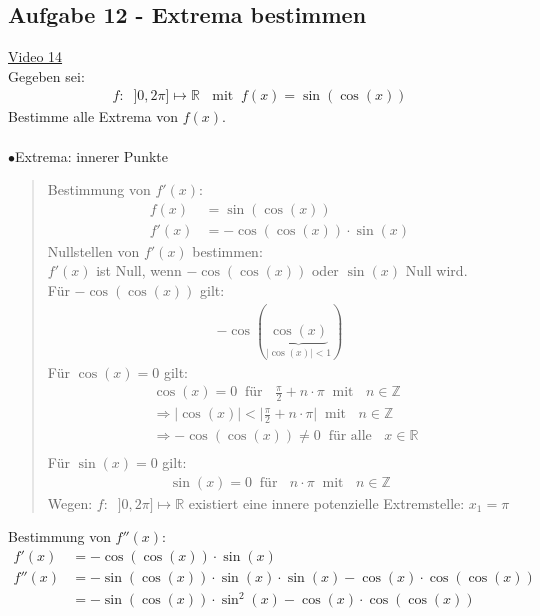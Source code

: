\subsection{Aufgabe 12 - Extrema bestimmen}
\href{https://youtu.be/cN-hCDhSnWw}{Video 14}\\
Gegeben sei:\\
\begin{align*}
f:\;\;]0,2\pi]\longmapsto\mathbb{R}\;\;\text{ mit}\;\;f(x)=\sin(\cos(x))
\end{align*}
Bestimme alle Extrema von $ f(x) $.\\
\\
$ \bullet $\;\;Extrema: \glqq innerer Punkte \grqq\\
\begin{quote}
	
	Bestimmung von $ f'(x) $:\\
	\begin{align*}
	f(x)&=\sin(\cos(x))\\
	f'(x)&=-\cos(\cos(x))\cdot \sin(x)
	\end{align*}
	Nullstellen von $ f'(x) $ bestimmen:\\
	$ f'(x) $ ist Null, wenn $ -\cos(\cos(x)) $ oder $ \sin(x) $ Null wird.\\
	Für $ -\cos(\cos(x)) $ gilt:
	\begin{align*}
	-\cos(\underbrace {\cos(x)}_{|\cos(x)|<1})
	\end{align*}
	Für $ \cos(x)=0 $ gilt:\\
	\begin{align*}
	&	\cos(x)=0\;\; \text{für }\;\;\frac{\pi}{2}+ n\cdot \pi\;\;\text{mit }\;\;n\in \mathbb{Z}\\
	&	\Rightarrow |\cos(x)|<\big|\frac{\pi}{2}+ n\cdot \pi\big|\;\;\text{mit }\;\;n\in \mathbb{Z}\\
	&\Rightarrow-\cos(\cos(x))\neq 0\;\;\text{für alle }\;\;x\in\mathbb{R}\\
	\end{align*}
	Für  $ \sin(x) =0$ gilt:\\
	\begin{align*}
	\sin(x)=0 \;\;\text{für }\;\;n\cdot\pi\;\;\text{mit }\;\;n\in \mathbb{Z}
	\end{align*}
	Wegen: $f:\;\;]0,2\pi]\longmapsto\mathbb{R}  $ existiert eine innere potenzielle Extremstelle: $ x_1=\pi $
\end{quote}
Bestimmung von $ f''(x) $:\\
\begin{align*}
f'(x)&=-\cos(\cos(x))\cdot \sin(x)\\
f''(x)&=-\sin(\cos(x))\cdot\sin(x)\cdot\sin(x)-\cos(x)\cdot\cos(\cos(x))\\
&=-\sin(\cos(x))\cdot\sin^2(x)-\cos(x)\cdot\cos(\cos(x))\\
\end{align*}
